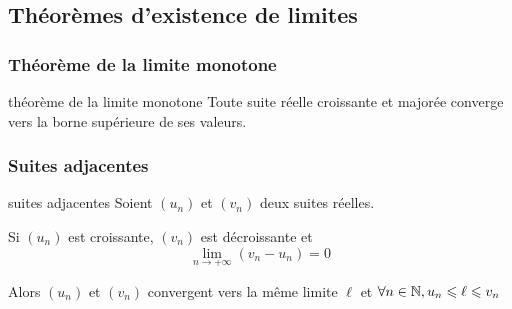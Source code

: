 \subsection{Théorèmes d'existence de limites}
\subsubsection{Théorème de la limite monotone}

\begin{theorement}{théorème de la limite monotone}{}
    Toute suite réelle croissante et majorée converge vers la borne supérieure de ses valeurs. 
    
\end{theorement}

\subsubsection{Suites adjacentes}

\begin{theorement}{suites adjacentes}{}
    Soient $(u_n)$ et $(v_n)$ deux suites réelles. 

    Si $(u_n)$ est croissante, $(v_n)$ est décroissante et
    $$\lim_{n \to +\infty} (v_n - u_n) = 0$$

    Alors $(u_n)$ et $(v_n)$ convergent vers la même limite $\ell$ 
    et $\forall n \in \mathbb{N}, u_n \leqslant \ell \leqslant v_n$
\end{theorement}

